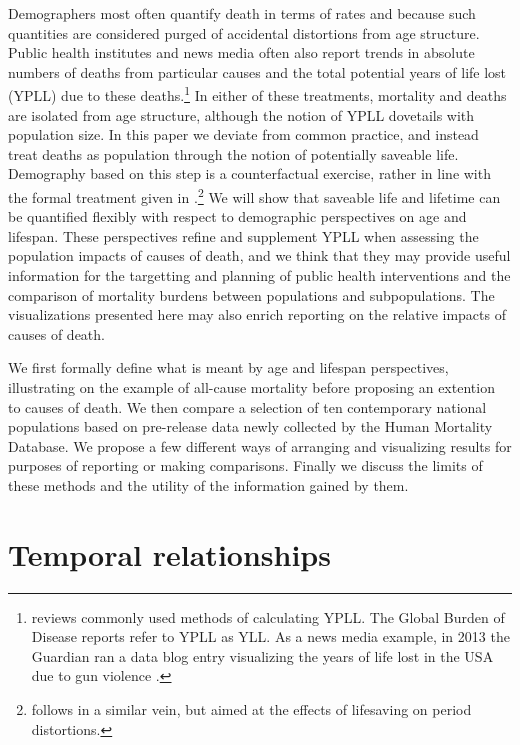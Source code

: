 \documentclass{article}
\begin{document}
Demographers most often quantify death in terms of rates and 
because such quantities are considered purged of accidental distortions from
age structure. Public health institutes and news media often also report trends
in absolute numbers of deaths from particular causes and the total potential years of life lost (YPLL) due to
these deaths.\footnote{\citet{gardner1990ypll} reviews commonly used methods of
calculating YPLL. The Global Burden of Disease reports refer to YPLL as YLL.
As a news media example, in 2013 the Guardian ran a data blog entry
visualizing the years of life lost in the USA due to gun violence
\citep{rogers2013gun}. } In either of these treatments, mortality and deaths are
isolated from age structure, although the notion of YPLL dovetails with
population size. In this paper we deviate from common practice, and
instead treat deaths as population through the notion of potentially saveable
life. Demography based on this step is a counterfactual exercise, rather in
line with the formal treatment given in
\citet{vaupel1987repeated}.\footnote{\citet{vaupel2008lifesaving} follows in a
similar vein, but aimed at the effects of lifesaving on period distortions.} We
will show that saveable life and lifetime can be quantified flexibly with respect to demographic perspectives on age and lifespan. These perspectives refine and supplement YPLL when assessing the population impacts of causes of death, and we
think that they may provide useful information for the targetting and planning
of public health interventions and the comparison of mortality burdens between
populations and subpopulations. The visualizations presented here may also
enrich reporting on the relative impacts of causes of death.

We first formally define what is meant by age and lifespan
perspectives, illustrating on the example of all-cause
mortality before proposing an extention to causes of death. We then compare a selection of ten
contemporary national populations based on pre-release data newly collected by
the Human Mortality Database. We propose a few different ways
of arranging and visualizing results for purposes of reporting or making
comparisons. Finally we discuss the limits of these methods and the
utility of the information gained by them.

\section*{Temporal relationships}
\end{document}
